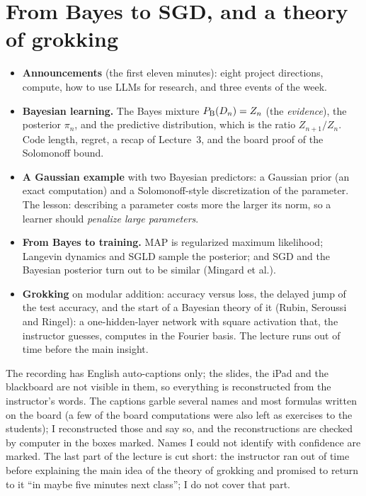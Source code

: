 \chapter{From Bayes to SGD, and a theory of grokking}\label{ch:L5}

\begin{glance}
\begin{itemize}
  \item \textbf{Announcements} (the first eleven minutes): eight project directions, compute, how to use LLMs for research, and three events of the week.
  \item \textbf{Bayesian learning.} The Bayes mixture $P_{\mathrm{B}}(D_n)=Z_n$ (the \emph{evidence}), the posterior $\pi_n$, and the predictive distribution, which is the ratio $Z_{n+1}/Z_n$. Code length, regret, a recap of Lecture~3, and the board proof of the Solomonoff bound.
  \item \textbf{A Gaussian example} with two Bayesian predictors: a Gaussian prior (an exact computation) and a Solomonoff-style discretization of the parameter. The lesson: describing a parameter costs more the larger its norm, so a learner should \emph{penalize large parameters}.
  \item \textbf{From Bayes to training.} MAP is regularized maximum likelihood; Langevin dynamics and SGLD sample the posterior; and SGD and the Bayesian posterior turn out to be similar (Mingard et al.).
  \item \textbf{Grokking} on modular addition: accuracy versus loss, the delayed jump of the test accuracy, and the start of a Bayesian theory of it (Rubin, Seroussi and Ringel): a one-hidden-layer network with square activation that, the instructor guesses, computes in the Fourier basis. The lecture runs out of time before the main insight.
\end{itemize}
\end{glance}

\begin{caution}
The recording has English auto-captions only; the slides, the iPad and the blackboard are not visible in them, so everything is reconstructed from the instructor's words. The captions garble several names and most formulas written on the board (a few of the board computations were also left as exercises to the students); I reconstructed those and say so, and the reconstructions are checked by computer in the boxes marked\dagmark{}. Names I could not identify with confidence are marked\flag. The last part of the lecture is cut short: the instructor ran out of time before explaining the main idea of the theory of grokking and promised to return to it ``in maybe five minutes next class''; I do not cover that part.
\end{caution}

